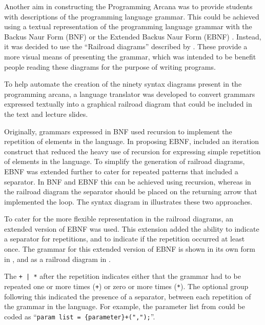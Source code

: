 Another aim in constructing the Programming Arcana was to provide students with descriptions of the programming language grammar. This could be achieved using a textual representation of the programming language grammar with the Backus Naur Form (BNF) \cite{Backus:1959} or the Extended Backus Naur Form (EBNF) \cite{Wirth:1977}. Instead, it was decided to use the ``Railroad diagrams'' described by \citet{Braz:1990}. These provide a more visual means of presenting the grammar, which was intended to be benefit people reading these diagrams for the purpose of writing programs.

To help automate the creation of the ninety syntax diagrams present in the programming arcana, a language translator was developed to convert grammars expressed textually into a graphical railroad diagram that could be included in the text and lecture slides. 

Originally, grammars expressed in BNF used recursion to implement the repetition of elements in the language. In proposing EBNF, \cite{Wirth:1977} included an iteration construct that reduced the heavy use of recursion for expressing simple repetition of elements in the language. To simplify the generation of railroad diagrams, EBNF was extended further to cater for repeated patterns that included a separator. In BNF and EBNF this can be achieved using recursion, whereas in the railroad diagram the separator should be placed on the returning arrow that implemented the loop. The syntax diagram in  illustrates these two approaches. 


To cater for the more flexible representation in the railroad diagrams, an extended version of EBNF was used. This extension added the ability to indicate a separator for repetitions, and to indicate if the repetition occurred at least once. The grammar for this extended version of EBNF is shown in its own form in , and as a railroad diagram in .



The \texttt{+ | *} after the repetition indicates either that the grammar had to be repeated one or more times (\texttt{+}) or zero or more times (\texttt{*}). The optional group following this indicated the presence of a separator, between each repetition of the grammar in the language. For example, the parameter list from  could be coded as ``\texttt{param list = \{parameter\}+(",");}''.

